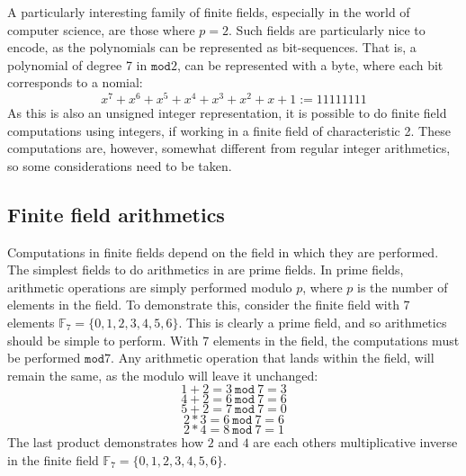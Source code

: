 A particularly interesting family of finite fields, especially in the world of computer science, are those where $p=2$. Such fields are particularly nice to encode, as the polynomials can be represented as bit-sequences. That is, a polynomial of degree 7 in $\mathtt{mod}2$, can be represented with a byte, where each bit corresponds to a nomial:
\[x^7+x^6+x^5+x^4+x^3+x^2+x+1:=11111111\]
As this is also an unsigned integer representation, it is possible to do finite field computations using integers, if working in a finite field of characteristic 2. These computations are, however, somewhat different from regular integer arithmetics, so some considerations need to be taken.

\subsection{Finite field arithmetics}
Computations in finite fields depend on the field in which they are performed. The simplest fields to do arithmetics in are prime fields. In prime fields, arithmetic operations are simply performed modulo $p$, where $p$ is the number of elements in the field. To demonstrate this, consider the finite field with 7 elements $\mathbb{F}_7=\{0,1,2,3,4,5,6\}$. This is clearly a prime field, and so arithmetics should be simple to perform. With 7 elements in the field, the computations must be performed $\mathtt{mod}7$. Any arithmetic operation that lands within the field, will remain the same, as the modulo will leave it unchanged:
\[1+2=3 ~ \mathtt{mod} ~ 7=3\]
\[4+2=6 ~ \mathtt{mod} ~ 7=6\]
\[5+2=7 ~ \mathtt{mod} ~ 7=0\]
\[2*3=6 ~ \mathtt{mod} ~ 7=6\]
\[2*4=8 ~ \mathtt{mod} ~ 7=1\]
The last product demonstrates how $2$ and $4$ are each others multiplicative inverse in the finite field $\mathbb{F}_7=\{0,1,2,3,4,5,6\}$.\\

